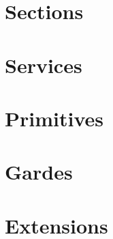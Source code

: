 %
%
%
%
%  
%


\section{Sections}









\section{Services}









\section{Primitives}









\section{Gardes}







\section{Extensions}

